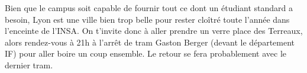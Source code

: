 Bien que le campus soit capable de fournir tout ce dont un étudiant standard a
besoin, Lyon est une ville bien trop belle pour rester cloîtré toute l'année dans
l'enceinte de l'INSA. On t'invite donc à aller prendre un verre place des
Terreaux, alors rendez-vous à 21h à l'arrêt de tram Gaston Berger (devant le
département IF) pour aller boire un coup ensemble. Le retour se fera
probablement avec le dernier tram.

